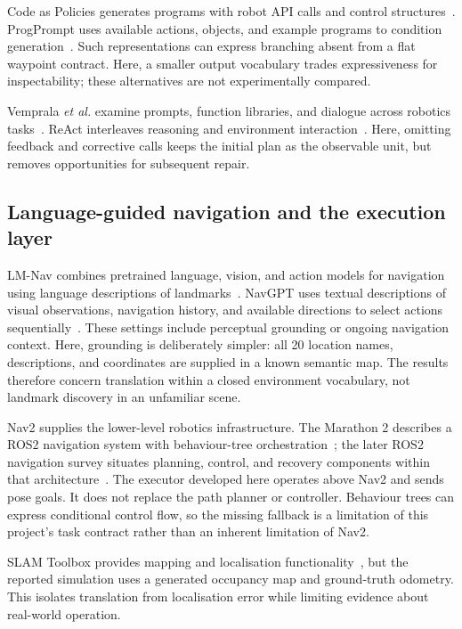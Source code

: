 \documentclass[journal]{IEEEtran}
\begin{document}
Code as Policies generates programs with robot API calls and control structures~\cite{liang2022code}. ProgPrompt uses available actions, objects, and example programs to condition generation~\cite{singh2022progprompt}. Such representations can express branching absent from a flat waypoint contract. Here, a smaller output vocabulary trades expressiveness for inspectability; these alternatives are not experimentally compared.

Vemprala \emph{et al.} examine prompts, function libraries, and dialogue across robotics tasks~\cite{vemprala2023chatgpt}. ReAct interleaves reasoning and environment interaction~\cite{yao2023react}. Here, omitting feedback and corrective calls keeps the initial plan as the observable unit, but removes opportunities for subsequent repair.

\subsection{Language-guided navigation and the execution layer}
LM-Nav combines pretrained language, vision, and action models for navigation using language descriptions of landmarks~\cite{shah2022lmnav}. NavGPT uses textual descriptions of visual observations, navigation history, and available directions to select actions sequentially~\cite{zhou2023navgpt}. These settings include perceptual grounding or ongoing navigation context. Here, grounding is deliberately simpler: all 20 location names, descriptions, and coordinates are supplied in a known semantic map. The results therefore concern translation within a closed environment vocabulary, not landmark discovery in an unfamiliar scene.

Nav2 supplies the lower-level robotics infrastructure. The Marathon 2 describes a ROS2 navigation system with behaviour-tree orchestration~\cite{macenski2020marathon}; the later ROS2 navigation survey situates planning, control, and recovery components within that architecture~\cite{macenski2023survey}. The executor developed here operates above Nav2 and sends pose goals. It does not replace the path planner or controller. Behaviour trees can express conditional control flow, so the missing fallback is a limitation of this project's task contract rather than an inherent limitation of Nav2.

SLAM Toolbox provides mapping and localisation functionality~\cite{macenski2021slam}, but the reported simulation uses a generated occupancy map and ground-truth odometry. This isolates translation from localisation error while limiting evidence about real-world operation.
\end{document}
